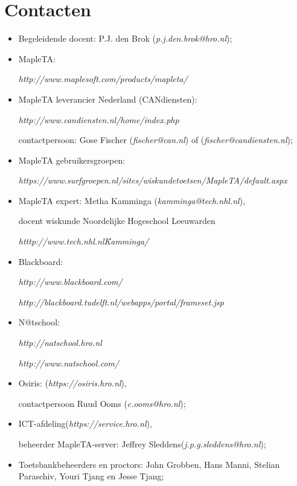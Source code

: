 \section*{Contacten}
\begin{itemize}
	\item Begeleidende docent: P.J. den Brok (\textsl{p.j.den.brok@hro.nl});
	\item MapleTA:
	
		\textsl{http://www.maplesoft.com/products/mapleta/}
	\item MapleTA leverancier Nederland (CANdiensten):
	
		\textsl{http://www.candiensten.nl/home/index.php}
		
		contactpersoon: Gose Fischer (\textsl{fischer@can.nl}) of (\textsl{fischer@candiensten.nl});
		
	\item MapleTA gebruikersgroepen:
	
		\textsl{https://www.surfgroepen.nl/sites/wiskundetoetsen/MapleTA/default.aspx}
		
	\item MapleTA expert: Metha Kamminga (\textsl{kamminga@tech.nhl.nl}),
	
	docent wiskunde Noordelijke Hogeschool Leeuwarden
	
	\textsl{htttp://www.tech.nhl.nl\~Kamminga/}
	
	\item Blackboard:
	
	\textsl{http://www.blackboard.com/}
	
	\textsl{http://blackboard.tudelft.nl/webapps/portal/frameset.jsp}
	
	\item N@tschool:
	
	\textsl{http://natschool.hro.nl}
	
	\textsl{http://www.natschool.com/}
	
	\item Osiris: (\textsl{https://osiris.hro.nl}),
	
	contactpersoon Ruud Ooms (\textsl{c.ooms@hro.nl});
	
	\item ICT-afdeling(\textsl{https://service.hro.nl}),
	
	beheerder MapleTA-server: Jeffrey Sleddens(\textsl{j.p.g.sleddens@hro.nl});
	
	\item Toetsbankbeheerders en proctors: John Grobben, Hans Manni, Stelian Paraschiv, Youri Tjang en Jesse Tjang;	
\end{itemize}

